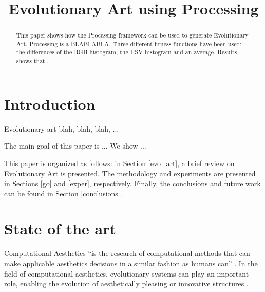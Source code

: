 \documentclass[conference]{IEEEtran}
\begin{document}
\title{Evolutionary Art using Processing}
\author{
\and
{}
\and
{}
}

\maketitle

\begin{abstract}
This paper shows how the Processing framework can be used to generate Evolutionary Art. Processing is a BLABLABLA. Three different fitness functions have been used: the differences of the RGB histogram, the HSV histogram and an average. Results shows that...
\end{abstract}

\section{Introduction}\label{intro}
Evolutionary art blah, blah, blah, ...

The main goal of this paper is ... We show ...

This paper is organized as follows: in Section \ref{evo_art}, a brief review on Evolutionary Art is presented. The methodology and experiments are presented in Sections \ref{go} and \ref{exper}, respectively. Finally, the conclusions and future work can be found in Section \ref{conclusions}.

\section{State of the art}
\label{sec:soa}

Computational Aesthetics ``is the research of computational methods that can make applicable aesthetics decisions in a similar fashion as humans can'' \cite{COMPAESTH}. In the field of computational aesthetics, evolutionary systems can play an important role, enabling the evolution of aesthetically pleasing or innovative structures \cite{dipaola2009incorporating}.
\end{document}
